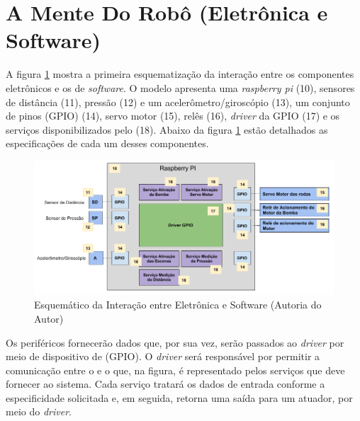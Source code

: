 \section{A Mente Do Robô (Eletrônica e Software)} \label{sec:mind-robot}
A figura \ref{fig:schema-interactive-electro-soft} mostra a primeira esquematização
da interação entre os componentes eletrônicos e os de \textit{software}. O modelo
apresenta uma \textit{raspberry pi} (10), sensores de distância (11), pressão (12) e
um acelerômetro/giroscópio (13), um conjunto de pinos (GPIO) (14), servo motor (15),
relês (16), \textit{driver} da GPIO (17) e os serviços disponibilizados pelo \software  (18).
Abaixo da figura \ref{fig:schema-interactive-electro-soft} estão detalhados as especificações
de cada um desses componentes.
\par
\begin{figure}[h]
  \centering
  \includegraphics[width=\textwidth]{figures/schema-interactive-eletro-soft.png}
  \caption{Esquemático da Interação entre Eletrônica e Software (\textsf{Autoria do Autor})}
  \label{fig:schema-interactive-electro-soft}
\end{figure}
\FloatBarrier
\par
Os periféricos fornecerão dados que, por sua vez, serão passados ao \textit{driver} por
meio de dispositivo de \hardware (GPIO).  O \textit{driver} será responsável por permitir
a comunicação entre o \hardware e o \software que, na figura, é representado pelos
serviços que deve fornecer ao sistema. Cada serviço tratará os dados de entrada
conforme a especificidade solicitada e, em seguida, retorna uma saída para um
atuador, por meio do \textit{driver}.
\par
